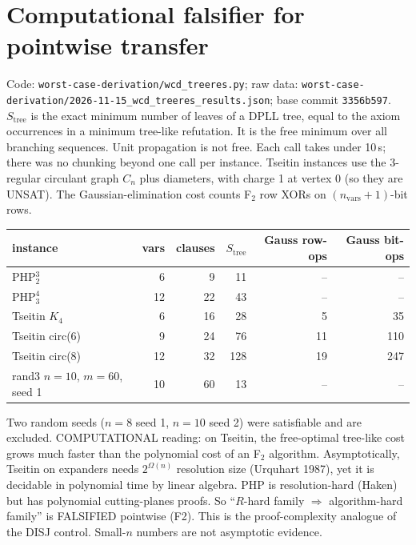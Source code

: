 \documentclass[11pt]{article}
\begin{document}
\section{Computational falsifier for pointwise transfer}
Code: \texttt{worst-case-derivation/wcd\_treeres.py}; raw data: \texttt{worst-case-derivation/2026-11-15\_wcd\_treeres\_results.json}; base commit \texttt{3356b597}.
$S_{\mathrm{tree}}$ is the exact minimum number of leaves of a DPLL tree, equal to the axiom occurrences in a minimum tree-like refutation.
It is the free minimum over all branching sequences. Unit propagation is not free. Each call takes under 10\,s; there was no chunking beyond one call per instance.
Tseitin instances use the 3-regular circulant graph $C_n$ plus diameters, with charge 1 at vertex 0 (so they are UNSAT).
The Gaussian-elimination cost counts F$_2$ row XORs on $(n_{\mathrm{vars}}+1)$-bit rows.
\begin{center}\begin{tabular}{lrrrrr}\toprule
instance & vars & clauses & $S_{\mathrm{tree}}$ & Gauss row-ops & Gauss bit-ops\\\midrule
PHP$^3_2$ & 6 & 9 & 11 & -- & --\\
PHP$^4_3$ & 12 & 22 & 43 & -- & --\\
Tseitin $K_4$ & 6 & 16 & 28 & 5 & 35\\
Tseitin circ(6) & 9 & 24 & 76 & 11 & 110\\
Tseitin circ(8) & 12 & 32 & 128 & 19 & 247\\
rand3 $n{=}10$, $m{=}60$, seed 1 & 10 & 60 & 13 & -- & --\\
\bottomrule\end{tabular}\end{center}
Two random seeds ($n{=}8$ seed 1, $n{=}10$ seed 2) were satisfiable and are excluded.
COMPUTATIONAL reading: on Tseitin, the free-optimal tree-like cost grows much faster than the polynomial cost of an F$_2$ algorithm.
Asymptotically, Tseitin on expanders needs $2^{\Omega(n)}$ resolution size (Urquhart 1987), yet it is decidable in polynomial time by linear algebra.
PHP is resolution-hard (Haken) but has polynomial cutting-planes proofs. So ``$R$-hard family $\Rightarrow$ algorithm-hard family'' is FALSIFIED pointwise (F2).
This is the proof-complexity analogue of the DISJ control. Small-$n$ numbers are not asymptotic evidence.
\end{document}
